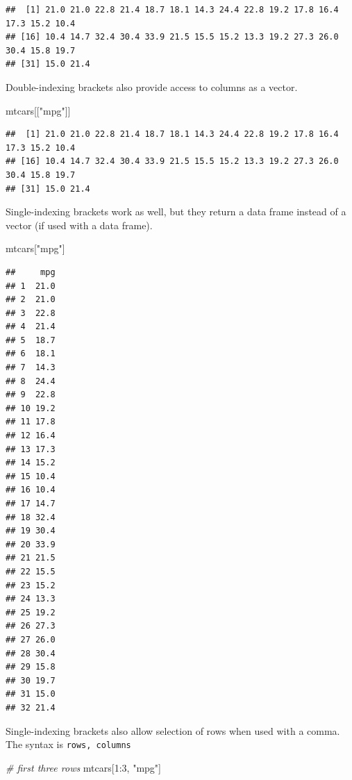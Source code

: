 \documentclass[
]{book}
\newenvironment{Shaded}{\begin{snugshade}}{\end{snugshade}}
\newcommand{\CommentTok}[1]{\textcolor[rgb]{0.56,0.35,0.01}{\textit{#1}}}
\newcommand{\DecValTok}[1]{\textcolor[rgb]{0.00,0.00,0.81}{#1}}
\newcommand{\NormalTok}[1]{#1}
\newcommand{\SpecialCharTok}[1]{\textcolor[rgb]{0.00,0.00,0.00}{#1}}
\newcommand{\StringTok}[1]{\textcolor[rgb]{0.31,0.60,0.02}{#1}}
\begin{document}
\begin{verbatim}
##  [1] 21.0 21.0 22.8 21.4 18.7 18.1 14.3 24.4 22.8 19.2 17.8 16.4 17.3 15.2 10.4
## [16] 10.4 14.7 32.4 30.4 33.9 21.5 15.5 15.2 13.3 19.2 27.3 26.0 30.4 15.8 19.7
## [31] 15.0 21.4
\end{verbatim}

Double-indexing brackets also provide access to columns as a vector.

\begin{Shaded}
\begin{Highlighting}[]
\NormalTok{mtcars[[}\StringTok{"mpg"}\NormalTok{]]}
\end{Highlighting}
\end{Shaded}

\begin{verbatim}
##  [1] 21.0 21.0 22.8 21.4 18.7 18.1 14.3 24.4 22.8 19.2 17.8 16.4 17.3 15.2 10.4
## [16] 10.4 14.7 32.4 30.4 33.9 21.5 15.5 15.2 13.3 19.2 27.3 26.0 30.4 15.8 19.7
## [31] 15.0 21.4
\end{verbatim}

Single-indexing brackets work as well, but they return a data frame instead of a vector (if used with a data frame).

\begin{Shaded}
\begin{Highlighting}[]
\NormalTok{mtcars[}\StringTok{"mpg"}\NormalTok{]}
\end{Highlighting}
\end{Shaded}

\begin{verbatim}
##     mpg
## 1  21.0
## 2  21.0
## 3  22.8
## 4  21.4
## 5  18.7
## 6  18.1
## 7  14.3
## 8  24.4
## 9  22.8
## 10 19.2
## 11 17.8
## 12 16.4
## 13 17.3
## 14 15.2
## 15 10.4
## 16 10.4
## 17 14.7
## 18 32.4
## 19 30.4
## 20 33.9
## 21 21.5
## 22 15.5
## 23 15.2
## 24 13.3
## 25 19.2
## 26 27.3
## 27 26.0
## 28 30.4
## 29 15.8
## 30 19.7
## 31 15.0
## 32 21.4
\end{verbatim}

Single-indexing brackets also allow selection of rows when used with a comma. The syntax is \texttt{rows,\ columns}

\begin{Shaded}
\begin{Highlighting}[]
\CommentTok{\# first three rows}
\NormalTok{mtcars[}\DecValTok{1}\SpecialCharTok{:}\DecValTok{3}\NormalTok{, }\StringTok{"mpg"}\NormalTok{]}
\end{Highlighting}
\end{Shaded}
\end{document}
